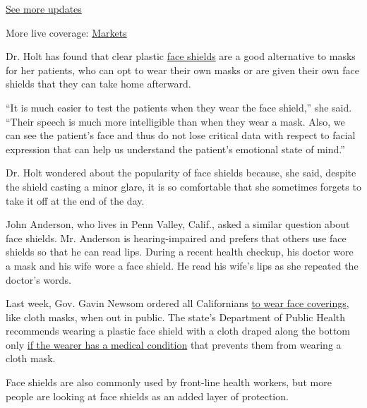 \href{https://www.nytimes3xbfgragh.onion/2020/09/11/world/covid-19-coronavirus.html?action=click\&pgtype=Article\&state=default\&region=MAIN_CONTENT_1\&context=storylines_live_updates}{See
more updates}

More live coverage:
\href{https://www.nytimes3xbfgragh.onion/live/2020/09/11/business/stock-market-today-coronavirus?action=click\&pgtype=Article\&state=default\&region=MAIN_CONTENT_1\&context=storylines_live_updates}{Markets}

Dr. Holt has found that clear plastic
\href{https://www.nytimes3xbfgragh.onion/2020/09/01/well/live/face-shields-masks-valves-vents.html}{face
shields} are a good alternative to masks for her patients, who can opt
to wear their own masks or are given their own face shields that they
can take home afterward.

``It is much easier to test the patients when they wear the face
shield,'' she said. ``Their speech is much more intelligible than when
they wear a mask. Also, we can see the patient's face and thus do not
lose critical data with respect to facial expression that can help us
understand the patient's emotional state of mind.''

Dr. Holt wondered about the popularity of face shields because, she
said, despite the shield casting a minor glare, it is so comfortable
that she sometimes forgets to take it off at the end of the day.

John Anderson, who lives in Penn Valley, Calif., asked a similar
question about face shields. Mr. Anderson is hearing-impaired and
prefers that others use face shields so that he can read lips. During a
recent health checkup, his doctor wore a mask and his wife wore a face
shield. He read his wife's lips as she repeated the doctor's words.

Last week, Gov. Gavin Newsom ordered all Californians
\href{https://www.cdph.ca.gov/Programs/CID/DCDC/CDPH\%20Document\%20Library/COVID-19/Guidance-for-Face-Coverings_06-18-2020.pdf}{to
wear face coverings}, like cloth masks, when out in public. The state's
Department of Public Health recommends wearing a plastic face shield
with a cloth draped along the bottom only
\href{https://www.cdph.ca.gov/Programs/CID/DCDC/CDPH\%20Document\%20Library/COVID-19/Guidance-for-Face-Coverings_06-18-2020.pdf}{if
the wearer has a medical condition} that prevents them from wearing a
cloth mask.

Face shields are also commonly used by front-line health workers, but
more people are looking at face shields as an added layer of protection.


